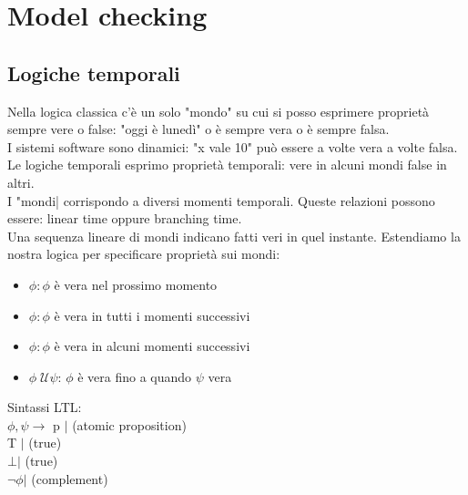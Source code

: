 \documentclass[12pt]{article}
\begin{document}
\section{Model checking} 
\subsection{Logiche temporali}
Nella logica classica c'è un solo "mondo" su cui si posso esprimere proprietà sempre vere o false: "oggi è lunedì" o è sempre vera o è sempre falsa.
\\ I sistemi software sono dinamici: "x vale 10" può essere a volte vera a volte falsa. Le logiche temporali esprimo proprietà temporali: vere in alcuni mondi false in altri.
\\ I "mondi| corrispondo a diversi momenti temporali. Queste relazioni possono essere: linear time oppure branching time.
\\ Una sequenza lineare di mondi indicano fatti veri in quel instante. Estendiamo la nostra logica per specificare proprietà sui mondi: 
\begin{itemize}
    \item 
        $\phi: \phi$ è vera nel prossimo momento
    \item 
        $\phi: \phi$ è vera in tutti i momenti successivi
    \item 
        $\phi: \phi$ è vera in alcuni momenti successivi
    \item $\phi \; \mathcal{U} \psi$: $\phi$ è vera fino a quando $\psi$ vera
\end{itemize}
Sintassi LTL: 
\\ $\phi, \psi \rightarrow$ p $|$ (atomic proposition) 
\\ \hspace*{5mm} T $|$ (true)
\\ \hspace*{5mm} $\bot |$ (true)
\\ \hspace*{5mm} $\neg \phi |$ (complement)
\end{document}
